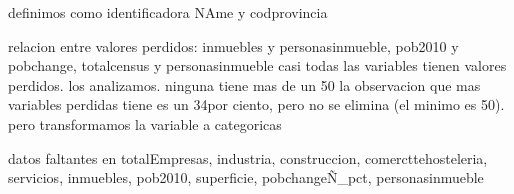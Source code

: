 \documentclass[a4paper,onecolumn]{article}
\let\stdsection\section
\renewcommand\section{\newpage\stdsection}
\begin{document}
\begin{sloppypar}
definimos como identificadora NAme y codprovincia

relacion entre valores perdidos: inmuebles y personasinmueble, pob2010 y pobchange, totalcensus y personasinmueble
casi todas las variables tienen valores perdidos. los analizamos. ninguna tiene mas de un 50%
la observacion que mas variables perdidas tiene es un 34por ciento, pero no se elimina (el minimo es 50). pero transformamos la variable a categoricas

datos faltantes en totalEmpresas, industria, construccion, comercttehosteleria, servicios, inmuebles, pob2010, superficie, pobchangeÑ_pct, personasinmueble


\appendix
%

\end{sloppypar}
\end{document}
